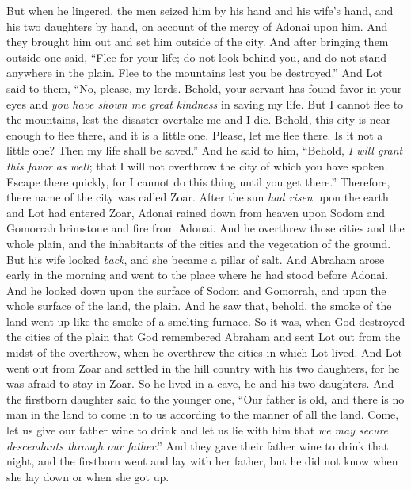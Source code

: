 \begin{biblechapter}
\verse But when he lingered, the men seized him by his hand and his wife’s hand, and his two daughters by hand, on account of the mercy of Adonai upon him. And they brought him out and set him outside of the city.
\verse And after bringing them outside one said, “Flee for your life; do not look behind you, and do not stand anywhere in the plain. Flee to the mountains lest you be destroyed.”
\verse And Lot said to them, “No, please, my lords.
\verse Behold, your servant has found favor in your eyes and \textit{you have shown me great kindness} in saving my life. But I cannot flee to the mountains, lest the disaster overtake me and I die.
\verse Behold, this city is near enough to flee there, and it is a little one. Please, let me flee there. Is it not a little one? Then my life shall be saved.”
\verse And he said to him, “Behold, \textit{I will grant this favor as well}; that I will not overthrow the city of which you have spoken.
\verse Escape there quickly, for I cannot do this thing until you get there.” Therefore, there name of the city was called Zoar.
 After the sun \textit{had risen} upon the earth and Lot had entered Zoar,
\verse Adonai rained down from heaven upon Sodom and Gomorrah brimstone and fire from Adonai.
\verse And he overthrew those cities and the whole plain, and the inhabitants of the cities and the vegetation of the ground.
\verse But his wife looked \textit{back}, and she became a pillar of salt.
\verse And Abraham arose early in the morning and went to the place where he had stood before Adonai.
\verse And he looked down upon the surface of Sodom and Gomorrah, and upon the whole surface of the land, the plain. And he saw that, behold, the smoke of the land went up like the smoke of a smelting furnace.
\verse So it was, when God destroyed the cities of the plain that God remembered Abraham and sent Lot out from the midst of the overthrow, when he overthrew the cities in which Lot lived.
 And Lot went out from Zoar and settled in the hill country with his two daughters, for he was afraid to stay in Zoar. So he lived in a cave, he and his two daughters.
\verse And the firstborn daughter said to the younger one, “Our father is old, and there is no man in the land to come in to us according to the manner of all the land.
\verse Come, let us give our father wine to drink and let us lie with him that \textit{we may secure descendants through our father}.”
\verse And they gave their father wine to drink that night, and the firstborn went and lay with her father, but he did not know when she lay down or when she got up.

\end{biblechapter}
